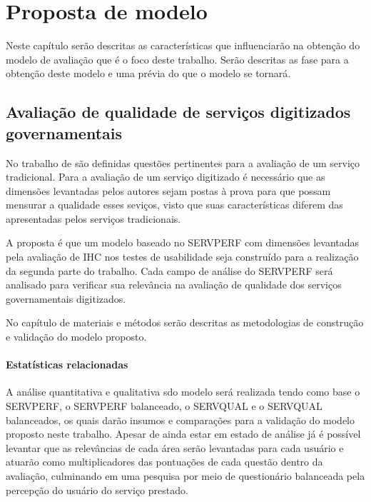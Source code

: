 \chapter[Proposta de modelo]{Proposta de modelo}
Neste capítulo serão descritas as características que influenciarão na obtenção do modelo de avaliação que é o foco deste trabalho. Serão descritas as fase para a obtenção deste modelo e uma prévia do que o modelo se tornará.

\section{Avaliação de qualidade de serviços digitizados governamentais}
No trabalho de \cite{cronintaylor1992} são definidas questões pertinentes para a avaliação de um serviço tradicional. Para a avaliação de um serviço digitizado é necessário que as dimensões levantadas pelos autores sejam postas à prova para que possam mensurar a qualidade esses seviços, visto que suas características diferem das apresentadas pelos serviços tradicionais.

A proposta é que um modelo baseado no SERVPERF com dimensões levantadas pela avaliação de IHC nos testes de usabilidade seja construído para a realização da segunda parte do trabalho. Cada campo de análise do SERVPERF será analisado para verificar sua relevância na avaliação de qualidade dos serviços governamentais digitizados.

No capítulo de materiais e métodos serão descritas as metodologias de construção e validação do modelo proposto.

\subsubsection{Estatísticas relacionadas}

A análise quantitativa e qualitativa sdo modelo será realizada tendo como base o SERVPERF, o SERVPERF balanceado, o SERVQUAL e o SERVQUAL balanceados, os quais darão insumos e comparações para a validação do modelo proposto neste trabalho. Apesar de ainda estar em estado de análise já é possível levantar que as relevâncias de cada área serão levantadas para cada usuário e atuarão como multiplicadores das pontuações de cada questão dentro da avaliação, culminando em uma pesquisa por meio de questionário balanceada pela percepção do usuário do serviço prestado.